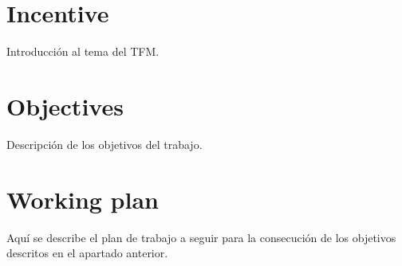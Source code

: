 \section{Incentive}
Introducción al tema del TFM.


\section{Objectives}
Descripción de los objetivos del trabajo.


\section{Working plan}
Aquí se describe el plan de trabajo a seguir para la consecución de los objetivos descritos en el apartado anterior.

